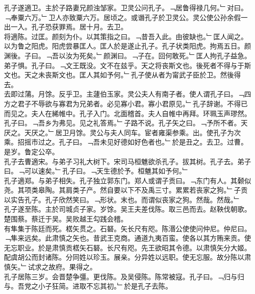 \documentclass{zhvt-classic}
\begin{document}
\hspace*{2em}孔子遂適卫。主於子路妻兄颜浊邹家。卫灵公问孔子。﹁居鲁得禄几何。﹂对曰。﹁奉粟六万。﹂卫人亦致粟六万。居顷之。或谮孔子於卫灵公。灵公使公孙余假一出一入。孔子恐获罪焉。居十月。去卫。\\
\hspace*{2em}将適陈。过匡。颜刻为仆。以其策指之曰。﹁昔吾入此。由彼缺也。﹂匡人闻之。以为鲁之阳虎。阳虎尝暴匡人。匡人於是遂止孔子。孔子状类阳虎。拘焉五日。颜渊後。子曰。﹁吾以汝为死矣。﹂颜渊曰。﹁子在。回何敢死。﹂匡人拘孔子益急。弟子惧。孔子曰。﹁文王既没。文不在兹乎。天之将丧斯文也。後死者不得与于斯文也。天之未丧斯文也。匡人其如予何。﹂孔子使从者为甯武子臣於卫。然後得去。\\
\hspace*{2em}去即过蒲。月馀。反乎卫。主蘧伯玉家。灵公夫人有南子者。使人谓孔子曰。﹁四方之君子不辱欲与寡君为兄弟者。必见寡小君。寡小君原见。﹂孔子辞谢。不得已而见之。夫人在絺帷中。孔子入门。北面稽首。夫人自帷中再拜。环珮玉声璆然。孔子曰。﹁吾乡为弗见。见之礼答焉。﹂子路不说。孔子矢之曰。﹁予所不者。天厌之。天厌之。﹂居卫月馀。灵公与夫人同车。宦者雍渠参乘。出。使孔子为次乘。招摇巿过之。孔子曰。﹁吾未见好德如好色者也。﹂於是丑之。去卫。过曹。是岁。鲁定公卒。\\
\hspace*{2em}孔子去曹適宋。与弟子习礼大树下。宋司马桓魋欲杀孔子。拔其树。孔子去。弟子曰。﹁可以速矣。﹂孔子曰。﹁天生德於予。桓魋其如予何。﹂\\
\hspace*{2em}孔子適郑。与弟子相失。孔子独立郭东门。郑人或谓子贡曰。﹁东门有人。其颡似尧。其项类皋陶。其肩类子产。然自要以下不及禹三寸。累累若丧家之狗。﹂子贡以实告孔子。孔子欣然笑曰。﹁形状。末也。而谓似丧家之狗。然哉。然哉。﹂\\
\hspace*{2em}孔子遂至陈。主於司城贞子家。岁馀。吴王夫差伐陈。取三邑而去。赵鞅伐朝歌。楚围蔡。蔡迁于吴。吴败越王勾践会稽。\\
\hspace*{2em}有隼集于陈廷而死。楛矢贯之。石砮。矢长尺有咫。陈湣公使使问仲尼。仲尼曰。﹁隼来远矣。此肃慎之矢也。昔武王克商。通道九夷百蛮。使各以其方贿来贡。使无忘职业。於是肃慎贡楛矢石砮。长尺有咫。先王欲昭其令德。以肃慎矢分大姬。配虞胡公而封诸陈。分同姓以珍玉。展亲。分异姓以远职。使无忘服。故分陈以肃慎矢。﹂试求之故府。果得之。\\
\hspace*{2em}孔子居陈三岁。会晋楚争彊。更伐陈。及吴侵陈。陈常被寇。孔子曰。﹁归与归与。吾党之小子狂简。进取不忘其初。﹂於是孔子去陈。\\
\end{document}
